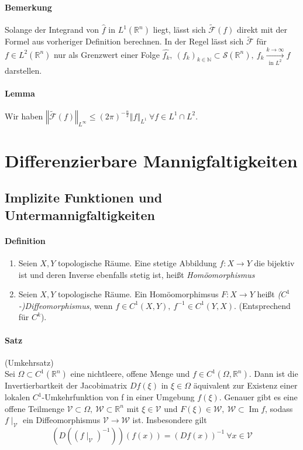 \documentclass[12pt,a4paper,fleqn]{article}
\DeclareMathOperator{\im}{Im}
\def\norm#1{{\left\Vert #1 \right\Vert}}
\def\R{{\mathbb{R}}}
\begin{document}
\paragraph{Bemerkung} Solange der Integrand von $\widehat{f}$ in $L^1(\R^n)$ liegt, lässt sich $\widetilde{\mathscr{F}}(f)$ direkt mit der Formel aus vorheriger Definition berechnen. In der Regel lässt sich $\widetilde{\mathscr{F}}$ für $f \in L^2(\R^n)$ nur als Grenzwert einer Folge $\widehat{f_k},\ (f_k)_{k\in \mathbb{N}} \subset \mathscr{S}(\R^n),\ f_k \xrightarrow[\text{in }L^2]{k\rightarrow \infty} f$ darstellen.

\paragraph{Lemma} Wir haben $\norm{\widetilde{\mathscr{F}}(f)}_{L^\infty} \leq (2\pi)^{-\frac{n}{2}} \norm{f}_{L^1}\ \forall f \in L^1 \cap L^2$.

\section{Differenzierbare Mannigfaltigkeiten}

\subsection{Implizite Funktionen und Untermannigfaltigkeiten}

\paragraph{Definition}
\begin{enumerate}
\item Seien $X, Y$ topologische Räume. Eine stetige Abbildung $f\colon X \rightarrow Y$ die bijektiv ist und deren Inverse ebenfalls stetig ist, heißt \textit{Homöomorphismus}
\item Seien $X, Y$ topologische Räume. Ein Homöomorphimsus $F\colon X \rightarrow Y$ heißt \textit{($C^1$-)Diffeomorphismus}, wenn $f \in C^1(X, Y),\ f^{-1} \in C^1(Y, X)$. (Entsprechend für $C^k$).
\end{enumerate}

\paragraph{Satz} (Umkehrsatz)\\
Sei $\Omega \subset C^1(\R^n)$ eine nichtleere, offene Menge und $f \in C^1(\Omega, \R^n)$. Dann ist die Invertierbartkeit der Jacobimatrix $Df(\xi)$ in $\xi \in \Omega$ äquivalent zur Existenz einer lokalen $C^1$-Umkehrfunktion von f in einer Umgebung $f(\xi)$. Genauer gibt es eine offene Teilmenge $\mathcal{V} \subset \Omega,\ \mathcal{W} \subset \R^n$ mit $\xi \in \mathcal{V}$ und $F(\xi) \in \mathcal{W},\ \mathcal{W} \subset \im f$, sodass $f\mid_\mathcal{V}$ ein Diffeomorphismus $\mathcal{V} \rightarrow \mathcal{W}$ ist. Insbesondere gilt
\begin{displaymath}
(D((f\mid_\mathcal{V})^{-1}))(f(x)) = (Df(x))^{-1}\ \forall x \in \mathcal{V}
\end{displaymath}
\end{document}
